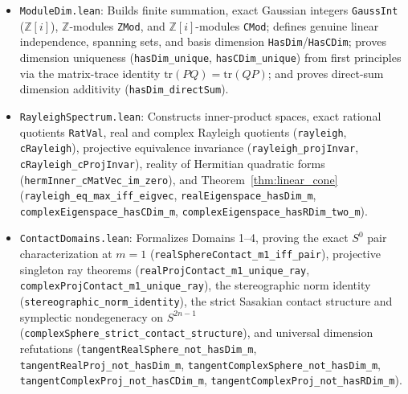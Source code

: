 \documentclass[11pt,a4paper]{article}
\theoremstyle{definition}
\theoremstyle{remark}
\newcommand{\ZZ}{\mathbb{Z}}
\newcommand{\tr}{\mathrm{tr}}
\begin{document}
{\raggedright
\begin{itemize}
  \item \texttt{ModuleDim.lean}: Builds finite summation, exact Gaussian integers \texttt{GaussInt} ($\ZZ[i]$), $\ZZ$-modules \texttt{ZMod}, and $\ZZ[i]$-modules \texttt{CMod}; defines genuine linear independence, spanning sets, and basis dimension \texttt{HasDim}/\texttt{HasCDim}; proves dimension uniqueness (\texttt{hasDim\_\allowbreak unique}, \texttt{hasCDim\_\allowbreak unique}) from first principles via the matrix-trace identity $\tr(P Q) = \tr(Q P)$; and proves direct-sum dimension additivity (\texttt{hasDim\_\allowbreak directSum}).
  \item \texttt{RayleighSpectrum.lean}: Constructs inner-product spaces, exact rational quotients \texttt{RatVal}, real and complex Rayleigh quotients (\texttt{rayleigh}, \texttt{cRayleigh}), projective equivalence invariance (\texttt{rayleigh\_\allowbreak projInvar}, \texttt{cRayleigh\_\allowbreak cProjInvar}), reality of Hermitian quadratic forms (\texttt{hermInner\_\allowbreak cMatVec\_\allowbreak im\_\allowbreak zero}), and Theorem~\ref{thm:linear_cone} (\texttt{rayleigh\_\allowbreak eq\_\allowbreak max\_\allowbreak iff\_\allowbreak eigvec}, \texttt{realEigenspace\_\allowbreak hasDim\_m}, \texttt{complexEigenspace\_\allowbreak hasCDim\_m}, \texttt{complexEigenspace\_\allowbreak hasRDim\_\allowbreak two\_m}).
  \item \texttt{ContactDomains.lean}: Formalizes Domains 1--4, proving the exact $S^0$ pair characterization at $m = 1$ (\texttt{realSphereContact\_\allowbreak m1\_\allowbreak iff\_\allowbreak pair}), projective singleton ray theorems (\texttt{realProjContact\_\allowbreak m1\_\allowbreak unique\_\allowbreak ray}, \texttt{complexProjContact\_\allowbreak m1\_\allowbreak unique\_\allowbreak ray}), the stereographic norm identity (\texttt{stereographic\_\allowbreak norm\_\allowbreak identity}), the strict Sasakian contact structure and symplectic nondegeneracy on $S^{2n-1}$ (\texttt{complexSphere\_\allowbreak strict\_\allowbreak contact\_\allowbreak structure}), and universal dimension refutations (\texttt{tangentRealSphere\_\allowbreak not\_\allowbreak hasDim\_m}, \texttt{tangentRealProj\_\allowbreak not\_\allowbreak hasDim\_m}, \texttt{tangentComplexSphere\_\allowbreak not\_\allowbreak hasDim\_m}, \texttt{tangentComplexProj\_\allowbreak not\_\allowbreak hasCDim\_m}, \texttt{tangentComplexProj\_\allowbreak not\_\allowbreak hasRDim\_m}).

\end{itemize}}
\end{document}
